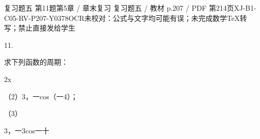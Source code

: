 \begin{bankitem}{复习题五 第11题}{第5章 / 章末复习 复习题五 / 教材 p.207 / PDF 第214页}{XJ-B1-C05-RV-P207-Y0378}{OCR未校对：公式与文字均可能有误；未完成数学TeX转写；禁止直接发给学生}
\begin{ocrdraft}
\par
11.
\par
求下列函数的周期：
\par
2x
\par
（2）3，一cos（一4）；
\par
（3）
\par
3，一3cos一十
\end{ocrdraft}
\end{bankitem}
